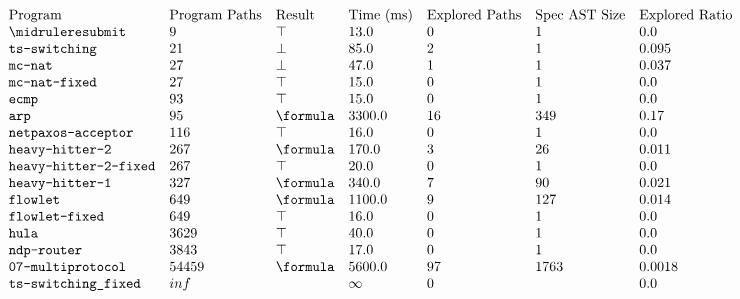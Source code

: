 \footnotesize
\[\begin{array}{l l l l l l l l}
    \text{Program} & \text{Program Paths} &  \text{Result} & \text{Time (ms)} & \text{Explored Paths} & \text{Spec AST Size} & \text{Explored Ratio}\\ \midrule

    \texttt{resubmit} & 9 & \top & 13.0 & 0  & 1 & 0.0 \\

    \texttt{ts-switching} & 21 & \bot & 85.0 & 2  & 1 & 0.095 \\

    \texttt{mc-nat} & 27 & \bot & 47.0 & 1  & 1 & 0.037 \\

    \texttt{mc-nat-fixed} & 27 & \top & 15.0 & 0  & 1 & 0.0 \\

    \texttt{ecmp} & 93 & \top & 15.0 & 0  & 1 & 0.0 \\

    \texttt{arp} & 95 & \formula & 3300.0 & 16  & 349 & 0.17 \\

    \texttt{netpaxos-acceptor} & 116 & \top & 16.0 & 0  & 1 & 0.0 \\

    \texttt{heavy-hitter-2} & 267 & \formula & 170.0 & 3  & 26 & 0.011 \\

    \texttt{heavy-hitter-2-fixed} & 267 & \top & 20.0 & 0  & 1 & 0.0 \\

    \texttt{heavy-hitter-1} & 327 & \formula & 340.0 & 7  & 90 & 0.021 \\

    \texttt{flowlet} & 649 & \formula & 1100.0 & 9  & 127 & 0.014 \\

    \texttt{flowlet-fixed} & 649 & \top & 16.0 & 0  & 1 & 0.0 \\

    \texttt{hula} & 3629 & \top & 40.0 & 0  & 1 & 0.0 \\

    \texttt{ndp-router} & 3843 & \top & 17.0 & 0  & 1 & 0.0 \\

    \texttt{07-multiprotocol} & 54459 & \formula & 5600.0 & 97  & 1763 & 0.0018 \\

    \texttt{ts-switching\_fixed} & inf &  & \infty & 0  &  & 0.0 \\


\end{array}\]
